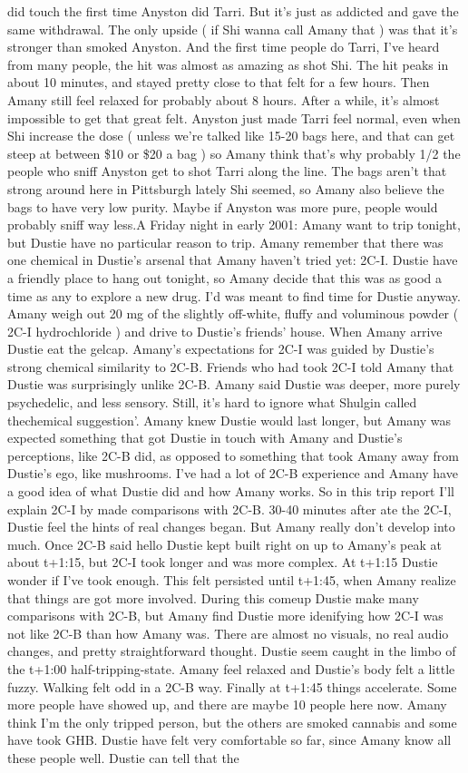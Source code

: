 \documentclass[12pt]{book}
\begin{document}
did touch the first time Anyston did Tarri. But it's just as addicted and gave the same withdrawal. The only upside ( if Shi wanna call Amany that ) was that it's stronger than smoked Anyston. And the first time people do Tarri, I've heard from many people, the hit was almost as amazing as shot Shi. The hit peaks in about 10 minutes, and stayed pretty close to that felt for a few hours. Then Amany still feel relaxed for probably about 8 hours. After a while, it's almost impossible to get that great felt. Anyston just made Tarri feel normal, even when Shi increase the dose ( unless we're talked like 15-20 bags here, and that can get steep at between \$10 or \$20 a bag ) so Amany think that's why probably 1/2 the people who sniff Anyston get to shot Tarri along the line. The bags aren't that strong around here in Pittsburgh lately Shi seemed, so Amany also believe the bags to have very low purity. Maybe if Anyston was more pure, people would probably sniff way less.A Friday night in early 2001: Amany want to trip tonight, but Dustie have no particular reason to trip. Amany remember that there was one chemical in Dustie's arsenal that Amany haven't tried yet: 2C-I. Dustie have a friendly place to hang out tonight, so Amany decide that this was as good a time as any to explore a new drug. I'd was meant to find time for Dustie anyway. Amany weigh out 20 mg of the slightly off-white, fluffy and voluminous powder ( 2C-I hydrochloride ) and drive to Dustie's friends' house. When Amany arrive Dustie eat the gelcap. Amany's expectations for 2C-I was guided by Dustie's strong chemical similarity to 2C-B. Friends who had took 2C-I told Amany that Dustie was surprisingly unlike 2C-B. Amany said Dustie was deeper, more purely psychedelic, and less sensory. Still, it's hard to ignore what Shulgin called thechemical suggestion'. Amany knew Dustie would last longer, but Amany was expected something that got Dustie in touch with Amany and Dustie's perceptions, like 2C-B did, as opposed to something that took Amany away from Dustie's ego, like mushrooms. I've had a lot of 2C-B experience and Amany have a good idea of what Dustie did and how Amany works. So in this trip report I'll explain 2C-I by made comparisons with 2C-B. 30-40 minutes after ate the 2C-I, Dustie feel the hints of real changes began. But Amany really don't develop into much. Once 2C-B said hello Dustie kept built right on up to Amany's peak at about t+1:15, but 2C-I took longer and was more complex. At t+1:15 Dustie wonder if I've took enough. This felt persisted until t+1:45, when Amany realize that things are got more involved. During this comeup Dustie make many comparisons with 2C-B, but Amany find Dustie more idenifying how 2C-I was not like 2C-B than how Amany was. There are almost no visuals, no real audio changes, and pretty straightforward thought. Dustie seem caught in the limbo of the t+1:00 half-tripping-state. Amany feel relaxed and Dustie's body felt a little fuzzy. Walking felt odd in a 2C-B way. Finally at t+1:45 things accelerate. Some more people have showed up, and there are maybe 10 people here now. Amany think I'm the only tripped person, but the others are smoked cannabis and some have took GHB. Dustie have felt very comfortable so far, since Amany know all these people well. Dustie can tell that the 
\end{document}
